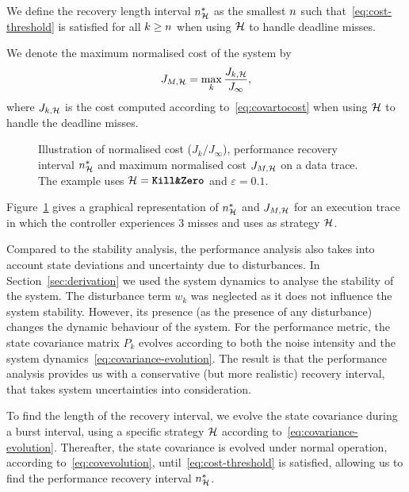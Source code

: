 \begin{definition}%
\label{def:recovery-lenght-interval}%
    We define the recovery length interval $n^*_{\mathcal{H}}$ as the smallest $n$ such that~\eqref{eq:cost-threshold} is satisfied for all $k \geq n$ when using $\mathcal{H}$ to handle deadline misses.
\end{definition}

\begin{definition}%
\label{def:maximum-system-cost}%
    We denote the maximum normalised cost of the system by
    \begin{equation}
        J_{M,\mathcal{H}} = \max_k \frac{J_{k, \mathcal{H}}}{J_\infty},
    \end{equation}
    where $J_{k,\mathcal{H}}$ is the cost computed according to~\eqref{eq:covartocost} when using $\mathcal{H}$ to handle the deadline misses.
\end{definition}
\begin{figure}[t]
    \centering
     
    \caption{Illustration of normalised cost ($J_k/J_\infty$), performance recovery interval $n^*_{\mathcal{H}}$ and maximum normalised cost $J_{M,\mathcal{H}}$ on a data trace. The example uses $\mathcal{H} = \text{\texttt{\textbf{Kill\&Zero}}{}}$ and $\varepsilon=0.1$.}
    \label{fig:recoveryandpeak}
\end{figure}
Figure~\ref{fig:recoveryandpeak} gives a graphical representation of $n^*_{\mathcal{H}}$ and $J_{M,\mathcal{H}}$ for an execution trace in which the controller experiences 3 misses and uses \tKZ{} as strategy $\mathcal{H}$.

Compared to the stability analysis, the performance analysis also takes into account state deviations and uncertainty due to disturbances.
In Section~\ref{sec:derivation} we used the system dynamics to analyse the stability of the system.
The disturbance term $w_k$ was neglected as it does not influence the system stability.
However, its presence (as the presence of any disturbance) changes the dynamic behaviour of the system.
For the performance metric, the state covariance matrix $P_k$ evolves according to both the noise intensity and the system dynamics~\eqref{eq:covariance-evolution}.
The result is that the performance analysis provides us with a conservative (but more realistic) recovery interval, that takes system uncertainties into consideration.

To find the length of the recovery interval, we evolve the state covariance during a burst interval, using a specific strategy $\mathcal{H}$ according to~\eqref{eq:covariance-evolution}.
Thereafter, the state covariance is evolved under normal operation, according to~\eqref{eq:covevolution}, until~\eqref{eq:cost-threshold} is satisfied, allowing us to find the performance recovery interval $n^*_{\mathcal{H}}$.
